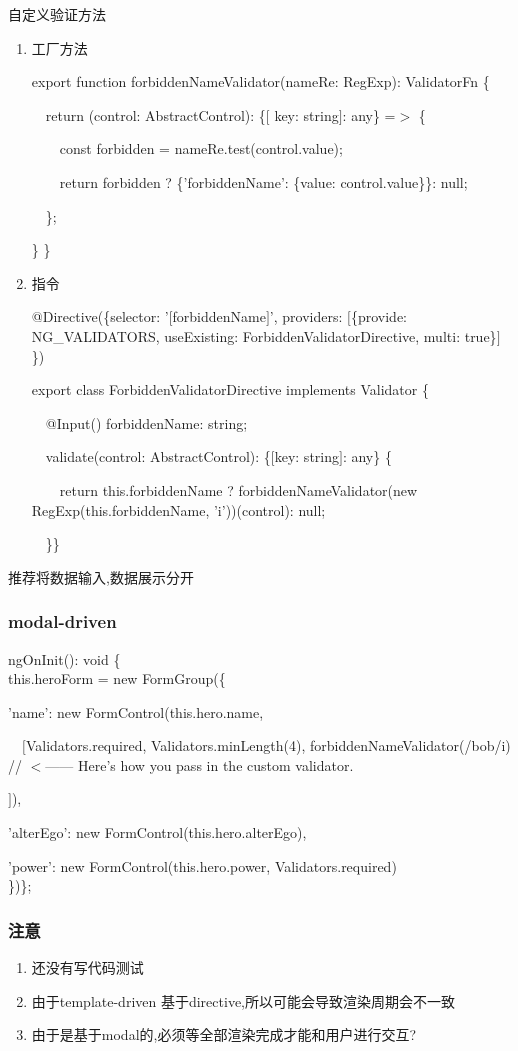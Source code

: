 \documentclass{article}
\begin{document}
自定义验证方法
\begin{enumerate}
\item 工厂方法
\par export function forbiddenNameValidator(nameRe: RegExp): ValidatorFn \{
\par\ \ return (control: AbstractControl): \{$[$ key: string$]$: any\} =$>$ \{
\par\ \ \ \ const forbidden = nameRe.test(control.value);
\par\ \ \ \ return forbidden ? \{'forbiddenName': \{value: control.value\}\}: null;
\par\ \ \};
\par \}
\}

\item 指令
\par @Directive(\{selector: '$[$forbiddenName$]$', providers: $[$\{provide: NG\_VALIDATORS, useExisting: ForbiddenValidatorDirective, multi: true\}$]$\})
\par export class ForbiddenValidatorDirective implements Validator \{  
\par\ \ @Input() forbiddenName: string;
\par\ \ validate(control: AbstractControl): \{$[$key: string$]$: any\} \{
\par\ \ \ \ return this.forbiddenName ? forbiddenNameValidator(new RegExp(this.forbiddenName, 'i'))(control): null;
\par\ \ \}\}


\end{enumerate}


推荐将数据输入,数据展示分开



\subsubsection{modal-driven}
ngOnInit(): void \{\\
this.heroForm = new FormGroup(\{
\par 'name': new FormControl(this.hero.name,
\par\ \  $[$Validators.required, Validators.minLength(4), forbiddenNameValidator(/bob/i) // $<$------ Here's how you pass in the custom validator. 
\par $]$),
\par 'alterEgo': new FormControl(this.hero.alterEgo),
\par 'power': new FormControl(this.hero.power, Validators.required)\\
\})\};

\subsubsection{注意}
\begin{enumerate}
\item 还没有写代码测试
\item 由于template-driven 基于directive,所以可能会导致渲染周期会不一致
\item 由于是基于modal的,必须等全部渲染完成才能和用户进行交互?


\end{enumerate}
\end{document}
